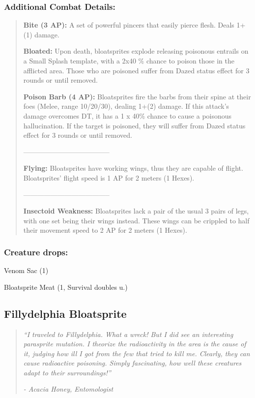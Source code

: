 \documentclass[11pt,a4paper,twocolumn]{book}
\begin{document}
	\subsubsection*{Additional Combat Details:}
	\begin{verse}
		\textbf{Bite (3 AP):} A set of powerful pincers that easily pierce flesh. Deals 1+(1) damage. 
		
		\textbf{Bloated:} Upon death, bloatsprites explode releasing poisonous entrails on a Small Splash template, with a 2x40 \%  chance to poison those in the afflicted area. Those who are poisoned suffer from Dazed status effect for 3 rounds or until removed.
		
		\textbf{Poison Barb (4 AP):} Bloatsprites fire the barbs from their spine at their foes (Melee, range 10/20/30), dealing 1+(2) damage. If this attack's damage overcomes DT, it has a 1 x 40\% chance to cause a poisonous hallucination. If the target is poisoned, they will suffer from Dazed status effect for 3 rounds or until removed.
		
		--------------------------------------
		
		\textbf{Flying:} Bloatsprites have working wings, thus they are capable of flight. Bloatsprites' flight speed is 1 AP for 2 meters (1 Hexes).
		
				--------------------------------------
		
		\textbf{Insectoid Weakness:} Bloatsprites lack a pair of the usual 3 pairs of legs, with one set being their wings instead. These wings can be crippled to half their movement speed to 2 AP for 2 meters (1 Hexes).
	\end{verse}
	
	\subsubsection*{Creature drops:}
	\begin{compactitem}
		\item Venom Sac (1)
		\item Bloatsprite Meat (1, Survival doubles u.)
	\end{compactitem}
	
	\subsection*{Fillydelphia Bloatsprite}
	\begin{quote}
		\emph{``I traveled to Fillydelphia. What a wreck! But I did see an interesting parasprite mutation. I theorize the radioactivity in the area is the cause of it, judging how ill I got from the few that tried to kill me. Clearly, they can cause radioactive poisoning. Simply fascinating, how well these creatures adapt to their surroundings!''}
		
		\emph{-	Acacia Honey, Entomologist}
	\end{quote}
	
\end{document}

